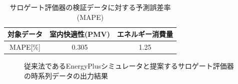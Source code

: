 \begin{table}[t]
  \begin{center}
    \caption{サロゲート評価器の検証データに対する予測誤差率(MAPE)}
    \label{tab::surrogate_predict}
    \small
    \begin{tabular}{c|c|c}
      \hline
      対象データ & 室内快適性(PMV) & エネルギー消費量 \\
      \hline \hline
      MAPE[\%]   & 0.305           & 1.25             \\
      \hline
    \end{tabular}
  \end{center}
\end{table}

\begin{figure}[t]
  \centering
  \caption{従来法であるEnergyPlusシミュレータと提案するサロゲート評価器の時系列データの出力結果}
  \label{fig::surrogate_predict}
\end{figure}

